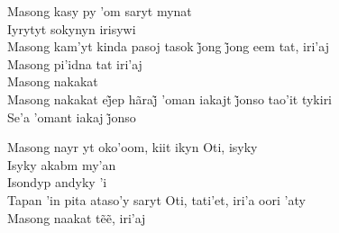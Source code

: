 \bigskip

\begin{linenumbers}\begingroup\raggedright
\noindent Masong kasy py 'om saryt mynat\\
Iyrytyt sokynyn irisywi\\
Masong kam’yt kinda pasoj tasok j̃ong j̃ong eem tat, iri’aj\\
Masong pi'idna tat iri'aj\\
Masong nakakat\\
Masong nakakat ej̃ep hãraj̃ ’oman iakajt j̃onso tao’it tykiri\\
Se’a ’omant iakaj j̃onso

\end{linenumbers}\endgroup

\bigskip

\begin{linenumbers}\begingroup\raggedright
\noindent Masong nayr yt oko'oom, kiit ikyn Oti, isyky\\
Isyky akabm my'an\\
Isondyp andyky 'i\\
Tapan 'in pita ataso'y saryt Oti, tati'et, iri'a oori 'aty\\
Masong naakat tẽẽ, iri’aj

\end{linenumbers}\endgroup

\bigskip


